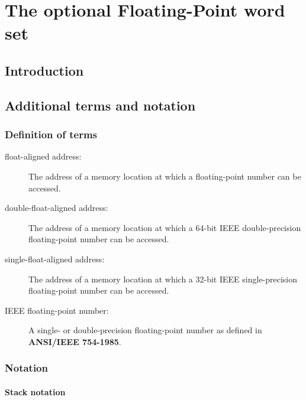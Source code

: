 
\chapter{The optional Floating-Point word set} %

\section{Introduction} %

\section{Additional terms and notation} %

\subsection{Definition of terms} %
\label{float:terms}

\begin{description}
\item[float-aligned address:]
	The address of a memory location at which a floating-point
	number can be accessed.

\item[double-float-aligned address:]
	The address of a memory location at which a 64-bit IEEE
	double-precision floating-point number can be accessed.

\item[single-float-aligned address:]
	The address of a memory location at which a 32-bit IEEE
	single-precision floating-point number can be accessed.

\item[IEEE floating-point number:]
	A single- or double-precision floating-point number as defined
	in \linebreak \textbf{ANSI/IEEE 754-1985}.
\end{description}

\subsection{Notation} %
\label{float:notation}

\subsubsection{Stack notation} %

